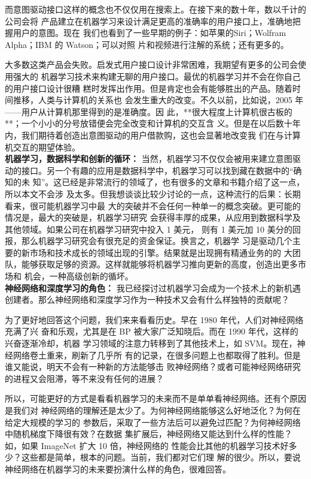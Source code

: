而意图驱动接口这样的概念也不仅仅用在搜索上。在接下来的数十年，数以千计的公司会将
产品建立在机器学习来设计满足更高的准确率的用户接口上，准确地把握用户的意图。现在
我们也看到了一些早期的例子：如苹果的Siri；Wolfram Alpha；IBM 的 Watson；可以对照
片和视频进行注解的系统；还有更多的。

大多数这类产品会失败。启发式用户接口设计非常困难，我期望有更多的公司会使用强大的
机器学习技术来构建无聊的用户接口。最优的机器学习并不会在你自己的用户接口设计很糟
糕时发挥出作用。但是肯定也会有能够胜出的产品。随着时间推移，人类与计算机的关系也
会发生重大的改变。不久以前，比如说，2005 年——用户从计算机那里得到的是准确度。因
此，**很大程度上计算机很古板的**；一个小小的分号放错便会完全改变和计算机的交互含
义。但是在以后数十年内，我们期待着创造出意图驱动的用户借款购，这也会显著地改变我
们在与计算机交互的期望体验。\\

\textbf{机器学习，数据科学和创新的循环：} 当然，机器学习不仅仅会被用来建立意图驱
动的接口。另一个有趣的应用是数据科学中，机器学习可以找到藏在数据中的“确知的未
知”。这已经是非常流行的领域了，也有很多的文章和书籍介绍了这一点，所以本文不会涉
及太多。但我想谈谈比较少讨论的一点，这种流行的后果：长期看来，很可能机器学习中最
大的突破并不会任何一种单一的概念突破。更可能的情况是，最大的突破是，机器学习研究
会获得丰厚的成果，从应用到数据科学及其他领域。如果公司在机器学习研究中投入 1 美元，
则有 1 美元加 10 美分的回报，那么机器学习研究会有很充足的资金保证。换言之，机器学
习是驱动几个主要的新市场和技术成长的领域出现的引擎。结果就是出现拥有精通业务的的
大团队，能够获取足够的资源。这样就能够将机器学习推向更新的高度，创造出更多市场和
机会，一种高级创新的循坏。\\

\textbf{神经网络和深度学习的角色：} 我已经探讨过机器学习会成为一个技术上的新机遇
创建者。那么神经网络和深度学习作为一种技术又会有什么样独特的贡献呢？

为了更好地回答这个问题，我们来来看看历史。早在 1980 年代，人们对神经网络充满了兴
奋和乐观，尤其是在 BP 被大家广泛知晓后。而在 1990 年代，这样的兴奋逐渐冷却，机器
学习领域的注意力转移到了其他技术上，如 SVM。现在，神经网络卷土重来，刷新了几乎所
有的记录，在很多问题上也都取得了胜利。但是谁又能说，明天不会有一种新的方法能够击
败神经网络？或者可能神经网络研究的进程又会阻滞，等不来没有任何的进展？

所以，可能更好的方式是看看机器学习的未来而不是单单看神经网络。还有个原因是我们对
神经网络的理解还是太少了。为何神经网络能够这么好地泛化？为何在给定大规模的学习的
参数后，采取了一些方法后可以避免过匹配？为何神经网络中随机梯度下降很有效？在数据
集扩展后，神经网络又能达到什么样的性能？如，如果 ImageNet 扩大 10 倍，神经网络的
性能会比其他的机器学习技术好多少？这些都是简单，根本的问题。当前，我们都对它们理
解的很少。所以，要说神经网络在机器学习的未来要扮演什么样的角色，很难回答。

